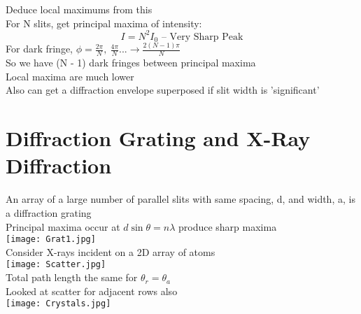 \documentclass[a4paper, 11pt, fleqn, normalem]{report}
\begin{document}
Deduce local maximums from this \\
For N slits, get principal maxima of intensity:
\begin{equation*}
    I = N^{2}I_{0}\text{ -- Very Sharp Peak}
\end{equation*}
For dark fringe, $\phi = \frac{2\pi}{N},~\frac{4\pi}{N} ...\rightarrow \frac{2(N - 1)\pi}{N}$ \\
So we have (N - 1) dark fringes between principal maxima \\
Local maxima are much lower \\
Also can get a diffraction envelope superposed if slit width is 'significant'

\section{Diffraction Grating and X-Ray Diffraction}
An array of a large number of parallel slits with same spacing, d, and width, a, is a diffraction grating \\
Principal maxima occur at $d\sin{\theta} = n\lambda$ produce sharp maxima \\
\texttt{[image: Grat1.jpg]} \\
Consider X-rays incident on a 2D array of atoms \\
\texttt{[image: Scatter.jpg]} \\
Total path length the same for $\theta_{r} = \theta_{a}$ \\
Looked at scatter for adjacent rows also \\
\texttt{[image: Crystals.jpg]}
\end{document}
